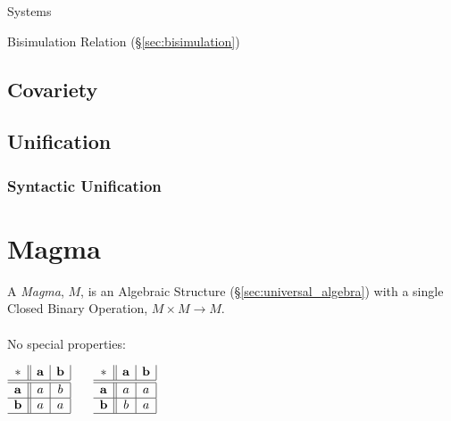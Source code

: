 \cite{rutten00}

Systems

Bisimulation Relation (\S\ref{sec:bisimulation})



\subsection{Covariety}\label{sec:covariety}

\subsection{Unification}\label{sec:unification}

\subsubsection{Syntactic Unification}\label{sec:syntactic_unification}



\section{Magma}\label{sec:magma}

A \emph{Magma}, $M$, is an Algebraic Structure
(\S\ref{sec:universal_algebra}) with a single Closed Binary Operation,
$M \times M \rightarrow M$.
\\ \\
No special properties:

$\begin{array}{c||c|c|}
  * & \mathbf{a} & \mathbf{b} \\ \hline \hline
  \mathbf{a} & a & b \\ \hline
  \mathbf{b} & a & a \\ \hline
\end{array}$ $\quad$ $\begin{array}{c||c|c|}
  * & \mathbf{a} & \mathbf{b} \\ \hline \hline
  \mathbf{a} & a & a \\ \hline
  \mathbf{b} & b & a \\ \hline
\end{array}$ \\ \hfill \\

